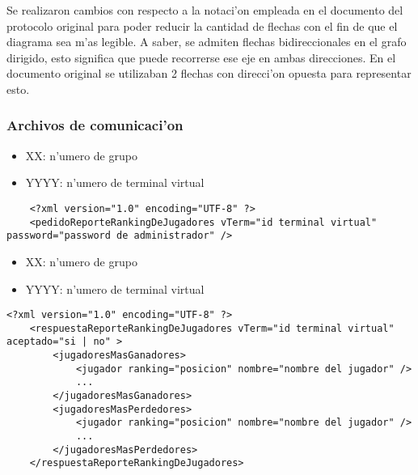 Se realizaron cambios con respecto a la notaci'on empleada en el documento del protocolo original para poder reducir la cantidad de flechas con el fin de que el diagrama sea m'as legible. A saber, se admiten flechas bidireccionales en el grafo dirigido, esto significa que puede recorrerse ese eje en ambas direcciones. En el documento original se utilizaban 2 flechas con direcci'on opuesta para representar esto.


\clearpage
\subsubsection{Archivos de comunicaci'on}

 
\begin{itemize}
    \item{XX: n'umero de grupo}
    \item{YYYY: n'umero de terminal virtual}
\end{itemize}

\begin{verbatim}
    <?xml version="1.0" encoding="UTF-8" ?>
    <pedidoReporteRankingDeJugadores vTerm="id terminal virtual" password="password de administrador" />
\end{verbatim}


 
\begin{itemize}
    \item{XX: n'umero de grupo}
    \item{YYYY: n'umero de terminal virtual}
\end{itemize}

\begin{verbatim}
<?xml version="1.0" encoding="UTF-8" ?>
    <respuestaReporteRankingDeJugadores vTerm="id terminal virtual" aceptado="si | no" >
        <jugadoresMasGanadores>
            <jugador ranking="posicion" nombre="nombre del jugador" />
            ...
        </jugadoresMasGanadores>
        <jugadoresMasPerdedores>
            <jugador ranking="posicion" nombre="nombre del jugador" />
            ...
        </jugadoresMasPerdedores>
    </respuestaReporteRankingDeJugadores>
\end{verbatim}


